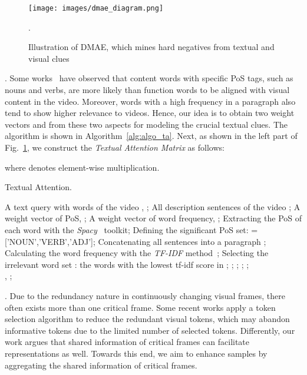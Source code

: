 \documentclass[sigconf]{acmart}
\begin{document}
\begin{figure}[ht!] \centering
\texttt{[image: images/dmae\_diagram.png]}
  \caption{Illustration of DMAE, which mines hard negatives from textual and visual clues}.
\label{fig:dmae_diagram}
\end{figure}


. \label{subsec:dmae_text}
Some works~\cite{finegrained2019,Chen2020FineGrainedVR,taco2021} have observed that content words with specific PoS tags, such as nouns and verbs, are more likely than function words to be aligned with visual content in the video. Moreover, words with a high frequency in a paragraph also tend to show higher relevance to videos. Hence, our idea is to obtain two weight vectors  and  from these two aspects for modeling the crucial textual clues.
The algorithm is shown in Algorithm~\ref{alg:algo_ta}. Next, as shown in the left part of Fig.~\ref{fig:dmae_diagram}, we construct the \textit{Textual Attention Matrix } as follows:
   
where  denotes element-wise multiplication.

\begin{algorithm}[htb]  
  \caption{Textual Attention.}  
  \label{alg:algo_ta}  
  \begin{algorithmic}[1]  
    \Require  
      A text query  with  words of the video , ;  
      All description sentences of the video ;
    \Ensure  
      A weight vector of PoS, ; 
      A weight vector of word frequency, ; 
    \State Extracting the PoS of each word with the \textit{Spacy}~\cite{spacy2} toolkit; \State Defining the significant PoS set:  = ['NOUN','VERB','ADJ'];
    \State Concatenating all sentences into a paragraph ;
    \State Calculating the word frequency with the \textit{TF-IDF} method~\cite{SprckJones2021ASI,Aizawa2003AnIP};
    \State Selecting the irrelevant word set : the  words with the lowest tf-idf score in ;
          \State ; 
        \Else \State ;
        \EndIf
         \State ;
        \Else \State ;
        \EndIf
    \EndFor 
    \label{code:fram:select} \\  
    \Return , ;  
  \end{algorithmic}  
\end{algorithm}  


. \label{subsec:dmae_vis}
Due to the redundancy nature in continuously changing visual frames, there often exists more than one critical frame. Some recent works \cite{centerclip2022,ts2net2022} apply a token selection algorithm to reduce the redundant visual tokens, which may abandon informative tokens due to the limited number of selected tokens. Differently, our work argues that shared information of critical frames can facilitate representations as well. 
Towards this end, we aim to enhance samples by aggregating the shared information of critical frames.
\end{document}
